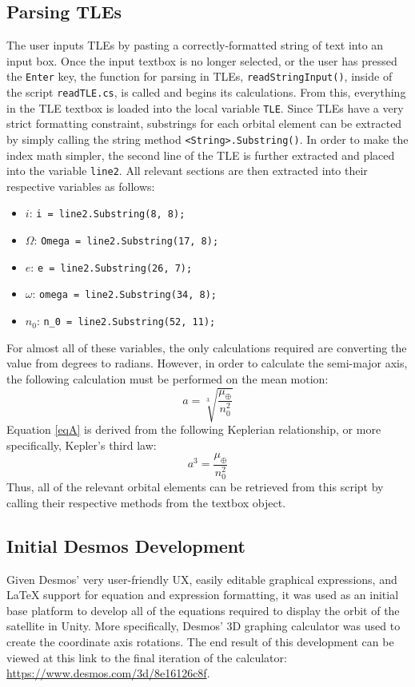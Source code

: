\documentclass[conference]{IEEEtran}
\begin{document}
		\subsection{Parsing TLEs}
			The user inputs TLEs by pasting a correctly-formatted string of text into an input box. Once the input textbox is no longer selected, or the user has pressed the \texttt{Enter} key, the function for parsing in TLEs, \texttt{readStringInput()}, inside of the script \texttt{readTLE.cs}, is called and begins its calculations. From this, everything in the TLE textbox is loaded into the local variable \texttt{TLE}. Since TLEs have a very strict formatting constraint, substrings for each orbital element can be extracted by simply calling the string method \texttt{<String>.Substring()}. In order to make the index math simpler, the second line of the TLE is further extracted and placed into the variable \texttt{line2}. All relevant sections are then extracted into their respective variables as follows:
			\begin{itemize}
				\item \( i \): \texttt{i = line2.Substring(8, 8);}
				\item \( \Omega \): \texttt{Omega = line2.Substring(17, 8);}
				\item \( e \): \texttt{e = line2.Substring(26, 7);}
				\item \( \omega \): \texttt{omega = line2.Substring(34, 8);}
				\item \( n_0 \): \texttt{n\_0 = line2.Substring(52, 11);}
			\end{itemize}
			For almost all of these variables, the only calculations required are converting the value from degrees to radians. However, in order to calculate the semi-major axis, the following calculation must be performed on the mean motion:
			\begin{equation}
				a=\sqrt[3]{\frac{\mu_{\oplus}}{n_0^2}}
				\label{eqA}
			\end{equation}
			Equation \eqref{eqA} is derived from the following Keplerian relationship, or more specifically, Kepler's third law:
			\begin{equation}
				a^3=\frac{\mu_{\oplus}}{n_0^2}
				\label{eqB}
			\end{equation}
			Thus, all of the relevant orbital elements can be retrieved from this script by calling their respective methods from the textbox object.

		\subsection{Initial Desmos Development}
			Given Desmos' very user-friendly UX, easily editable graphical expressions, and LaTeX support for equation and expression formatting, it was used as an initial base platform to develop all of the equations required to display the orbit of the satellite in Unity. More specifically, Desmos' 3D graphing calculator was used to create the coordinate axis rotations. The end result of this development can be viewed at this link to the final iteration of the calculator: \url{https://www.desmos.com/3d/8e16126c8f}.
\end{document}
